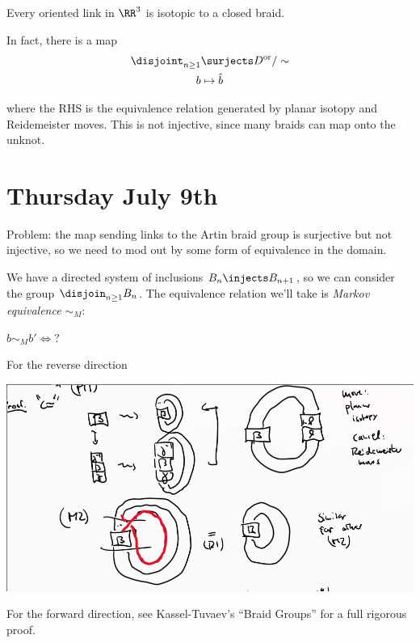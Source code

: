 \begin{description}
\tightlist
\item[Theorem (Alexander)]
Every oriented link in \(\RR^3\) is isotopic to a closed braid.
\end{description}

In fact, there is a map \begin{align*}
\disjoint_{n\geq 1} &\surjects D^{\text{or}} /\sim \\
b & \mapsto \hat b
\end{align*}

where the RHS is the equivalence relation generated by planar isotopy
and Reidemeister moves. This is not injective, since many braids can map
onto the unknot.

\hypertarget{thursday-july-9th}{%
\section{Thursday July 9th}\label{thursday-july-9th}}

Problem: the map sending links to the Artin braid group is surjective
but not injective, so we need to mod out by some form of equivalence in
the domain.

We have a directed system of inclusions \(B_n \injects B_{n+1}\), so we
can consider the group \(\disjoin_{n\geq 1} B_n\). The equivalence
relation we'll take is \emph{Markov equivalence} \(\sim_M\):

\begin{description}
\tightlist
\item[Theorem]
\(b \sim_M b' \iff ?\)
\item[Proof]
For the reverse direction
\end{description}

\includegraphics{figures/image_2020-07-09-11-17-40.png}

For the forward direction, see Kassel-Tuvaev's ``Braid Groups'' for a
full rigorous proof.

